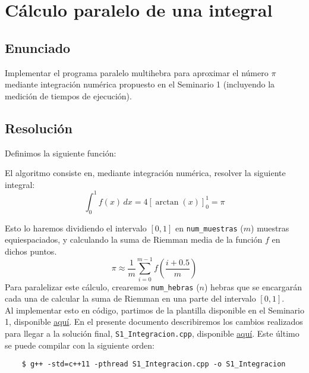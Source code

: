 \chapter{Cálculo paralelo de una integral}
    
    
\section{Enunciado}
Implementar el programa paralelo multihebra para aproximar el número $\pi$ mediante integración numérica propuesto en el Seminario 1 (incluyendo la medición de tiempos de ejecución).

\section{Resolución}
Definimos la siguiente función:

El algoritmo consiste en, mediante integración numérica, resolver la siguiente integral:
\[
    \int_{0}^{1} f(x) \, dx = 4\left[\arctan(x)\right]_{0}^{1} = \pi
\]

Esto lo haremos dividiendo el intervalo $[0,1]$ en \verb|num_muestras| ($m$) muestras equiespaciados, y calculando la suma de Riemman media de la función $f$ en dichos puntos.
\begin{equation*}
    \pi \approx \frac{1}{m} \sum_{i=0}^{m-1} f\left(\frac{i+0.5}{m}\right) 
\end{equation*}
Para paralelizar este cálculo, crearemos \verb|num_hebras| ($n$) hebras que se encargarán cada una de calcular la suma de Riemman en una parte del intervalo $[0,1]$.\\

Al implementar esto en código, partimos de la plantilla disponible en el Seminario 1, disponible \href{https://github.com/LosDelDGIIM/LosDelDGIIM.github.io/blob/main/subjects/SCD/Seminarios/Programas/S1_Integracion_Plantilla.cpp}{\color{blue}\ul{aquí}}.
En el presente documento describiremos los cambios realizados para llegar a la solución final, \verb|S1_Integracion.cpp|, disponible \href{https://github.com/LosDelDGIIM/LosDelDGIIM.github.io/blob/main/subjects/SCD/Seminarios/Programas/S1_Integracion.cpp}{\color{blue}\ul{aquí}}.
Este último se puede compilar con la siguiente orden:
\begin{verbatim}
    $ g++ -std=c++11 -pthread S1_Integracion.cpp -o S1_Integracion
\end{verbatim}


